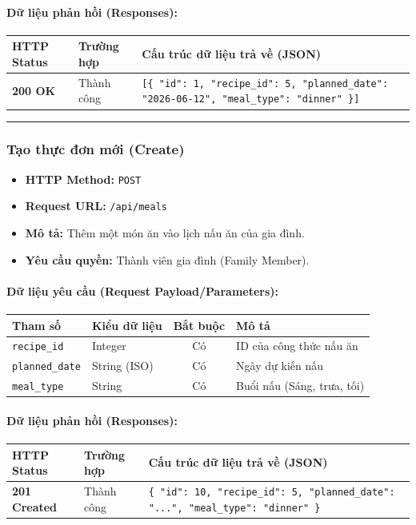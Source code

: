 \documentclass[12pt,a4paper]{article}
\begin{document}
\paragraph{Dữ liệu phản hồi (Responses):}
\begin{longtable}{|p{2.8cm}|p{3.2cm}|p{8.0cm}|}
\hline
\textbf{HTTP Status} & \textbf{Trường hợp} & \textbf{Cấu trúc dữ liệu trả về (JSON)} \\ \hline
\endhead
\textbf{200 OK} & Thành công & \texttt{[\{ "id": 1, "recipe\_id": 5, "planned\_date": "2026-06-12", "meal\_type": "dinner" \}]} \\ \hline
\end{longtable}

\vskip 0.4cm
\noindent\rule{\textwidth}{0.3pt}
\vskip 0.4cm

\subsubsection{Tạo thực đơn mới (Create)}
\begin{itemize}[leftmargin=*]
    \item \textbf{HTTP Method:} \texttt{POST}
    \item \textbf{Request URL:} \texttt{/api/meals}
    \item \textbf{Mô tả:} Thêm một món ăn vào lịch nấu ăn của gia đình.
    \item \textbf{Yêu cầu quyền:} Thành viên gia đình (Family Member).
\end{itemize}

\paragraph{Dữ liệu yêu cầu (Request Payload/Parameters):}
\begin{longtable}{|p{2.8cm}|p{2.2cm}|c|p{7.0cm}|}
\hline
\textbf{Tham số} & \textbf{Kiểu dữ liệu} & \textbf{Bắt buộc} & \textbf{Mô tả} \\ \hline
\endhead
\texttt{recipe\_id} & Integer & Có & ID của công thức nấu ăn \\ \hline
\texttt{planned\_date} & String (ISO) & Có & Ngày dự kiến nấu \\ \hline
\texttt{meal\_type} & String & Có & Buổi nấu (Sáng, trưa, tối) \\ \hline
\end{longtable}

\paragraph{Dữ liệu phản hồi (Responses):}
\begin{longtable}{|p{2.8cm}|p{3.2cm}|p{8.0cm}|}
\hline
\textbf{HTTP Status} & \textbf{Trường hợp} & \textbf{Cấu trúc dữ liệu trả về (JSON)} \\ \hline
\endhead
\textbf{201 Created} & Thành công & \texttt{\{ "id": 10, "recipe\_id": 5, "planned\_date": "...", "meal\_type": "dinner" \}} \\ \hline
\end{longtable}
\end{document}
